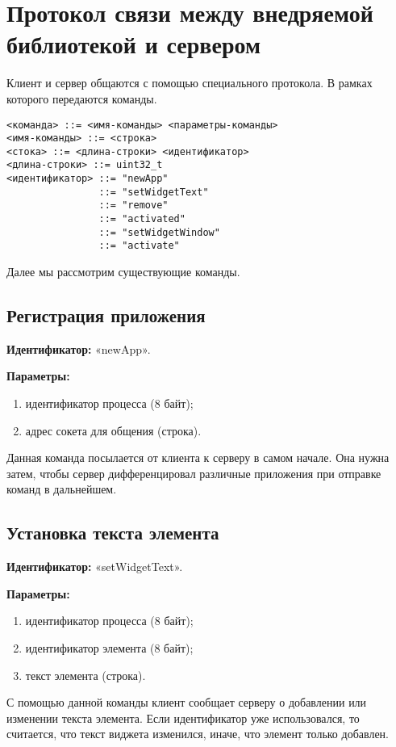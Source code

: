 \section{Протокол связи между внедряемой библиотекой и сервером}

Клиент и сервер общаются с помощью специального протокола. В рамках которого
передаются команды.

\begin{verbatim}
<команда> ::= <имя-команды> <параметры-команды>
<имя-команды> ::= <строка>
<стока> ::= <длина-строки> <идентификатор>
<длина-строки> ::= uint32_t
<идентификатор> ::= "newApp"
                ::= "setWidgetText"
                ::= "remove"
                ::= "activated"
                ::= "setWidgetWindow"
                ::= "activate"
\end{verbatim}

Далее мы рассмотрим существующие команды.

\subsection{Регистрация приложения}

\textbf{Идентификатор:} «newApp».

\textbf{Параметры:}
\begin{enumerate}
\item идентификатор процесса (8 байт);
\item адрес сокета для общения (строка).
\end{enumerate}

Данная команда посылается от клиента к серверу в самом начале. Она нужна затем,
чтобы сервер дифференцировал различные приложения при отправке команд в
дальнейшем.

\subsection{Установка текста элемента}

\textbf{Идентификатор:} «setWidgetText».

\textbf{Параметры:}
\begin{enumerate}
\item идентификатор процесса (8 байт);
\item идентификатор элемента (8 байт);
\item текст элемента (строка).
\end{enumerate}

С помощью данной команды клиент сообщает серверу о добавлении или изменении
текста элемента. Если идентификатор уже использовался, то считается, что текст
виджета изменился, иначе, что элемент только добавлен.

